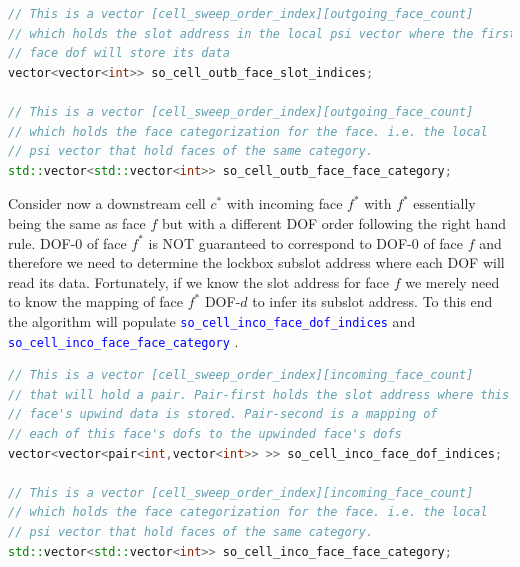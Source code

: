 \documentclass[11pt,letterpaper,titlepage]{article}
\newcommand{\xmltag}[1]{\textcolor{blue}{ \texttt{#1}} }
\numberwithin{equation}{section}
\begin{document}
\begin{lstlisting}[language=c++]
// This is a vector [cell_sweep_order_index][outgoing_face_count]
// which holds the slot address in the local psi vector where the first
// face dof will store its data
vector<vector<int>> so_cell_outb_face_slot_indices;

// This is a vector [cell_sweep_order_index][outgoing_face_count]
// which holds the face categorization for the face. i.e. the local
// psi vector that hold faces of the same category.
std::vector<std::vector<int>> so_cell_outb_face_face_category;
\end{lstlisting}

Consider now a downstream cell $c^*$ with incoming face $f^*$ with $f^*$ essentially being the same as face $f$ but with a different DOF order following the right hand rule. DOF-$0$ of face $f^*$ is NOT guaranteed to correspond to DOF-$0$ of face $f$ and therefore we need to determine the lockbox subslot address where each DOF will read its data. Fortunately, if we know the slot address for face $f$ we merely need to know the mapping of face $f^*$ DOF-$d$ to infer its subslot address. To this end the algorithm will populate \xmltag{so\_cell\_inco\_face\_dof\_indices} and \xmltag{so\_cell\_inco\_face\_face\_category}.
 
\begin{lstlisting}[language=c++]
// This is a vector [cell_sweep_order_index][incoming_face_count]
// that will hold a pair. Pair-first holds the slot address where this
// face's upwind data is stored. Pair-second is a mapping of
// each of this face's dofs to the upwinded face's dofs
vector<vector<pair<int,vector<int>> >> so_cell_inco_face_dof_indices;

// This is a vector [cell_sweep_order_index][incoming_face_count]
// which holds the face categorization for the face. i.e. the local
// psi vector that hold faces of the same category.
std::vector<std::vector<int>> so_cell_inco_face_face_category;
\end{lstlisting}
\end{document}
